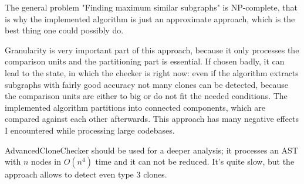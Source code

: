 \documentclass[a0,portrait]{a0poster}
\begin{document}
\begin{multicols}{2}
The general problem "Finding maximum similar subgraphs" is NP-complete, that is why the
implemented algorithm is just an approximate approach, which is the best thing one could
possibly do.

Granularity is very important part of this approach, because it only processes the
comparison units and the partitioning part is essential. If chosen badly, it can lead to
the state, in which the checker is right now: even if the algorithm extracts subgraphs
with fairly good accuracy not many clones can be detected, because the comparison units
are either to big or do not fit the needed conditions. The implemented algorithm
partitions into connected components, which are compared against each other afterwards.
This approach has many negative effects I encountered while processing large codebases.

AdvancedCloneChecker should be used for a deeper analysis; it processes an AST with $n$
nodes in $O(n^4)$ time and it can not be reduced. It's quite slow, but the approach
allows to detect even type 3 clones.



\end{multicols}
\end{document}
